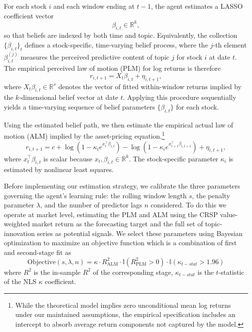 \documentclass[11pt]{article}
\begin{document}
For each stock \(i\) and each window ending at \(t-1\), the agent estimates a LASSO
coefficient vector
\begin{equation}
\beta_{i,t} \in \mathbb{R}^{k},
\end{equation}
so that beliefs are indexed by both time and topic. Equivalently, the collection
\(\{\beta_{i,t}\}_t\) defines a stock-specific, time-varying belief process, where the
\(j\)-th element \(\beta_{i,t}^{(j)}\) measures the perceived predictive content of topic \(j\)
for stock \(i\) at date \(t\).
The empirical perceived law of motion (PLM) for log returns is therefore
\begin{equation}\label{eq:empirical_plm}
r_{i,t+1} = X_t \beta_{i,t} + \eta_{i,t+1},
\end{equation}
where \(X_t \beta_{i,t} \in \mathbb{R}^{s}\) denotes the vector of fitted within-window returns
implied by the \(k\)-dimensional belief vector at date \(t\).
Applying this procedure sequentially yields a time-varying sequence of belief parameters
\(\{\beta_{i,t}\}\) for each stock.

Using the estimated belief path, we then estimate the empirical actual law of motion
(ALM) implied by the asset-pricing equation.\footnote{While the theoretical model implies
zero unconditional mean log returns under our maintained assumptions, the empirical
specification includes an intercept to absorb average return components not captured by
the model.}
\begin{equation}\label{eq:empirical_alm}
r_{i,t+1}
= c
+ \log\!\left(1 - \kappa_i e^{x_t^\top \beta_{i,t}}\right)
- \log\!\left(1 - \kappa_i e^{x_{t+1}^\top \beta_{i,t+1}}\right)
+ \eta_{i,t+1},
\end{equation}
where \(x_t^\top \beta_{i,t}\) is scalar because \(x_t, \beta_{i,t} \in \mathbb{R}^{k}\).
The stock-specific parameter \(\kappa_i\) is estimated by nonlinear least squares.


Before implementing our estimation strategy, we calibrate the three parameters governing the agent’s learning rule: 
the rolling window length \(s\), the penalty parameter \(\lambda\), and the number of predictor lags \(n\) considered.
To do this we operate at market level, estimating the PLM and ALM using the CRSP value-weighted market return as the forecasting target and the full set of topic-innovation series as potential signals.
We select these parameters using Bayesian optimization to maximize an objective function which is a combination of first and second-stage fit as
\[ \text{Objective}(s, \lambda, n)
= \kappa \cdot
R^2_{\text{ALM}} \cdot \mathbb{I}\left(R^2_{\text{PLM}} > 0\right) \cdot \mathbb{I}\left(\kappa_{t-stat} > 1.96\right) \] 
where \(R^2_{}\) is the in-sample \(R^2\) of the corresponding stage,
\(\kappa_{t-stat}\) is the \(t\)-statistic of the NLS $\kappa$ coefficient.
\end{document}
